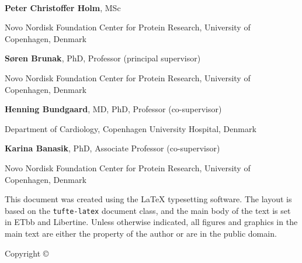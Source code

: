 \begin{@empty}
~\vfill
\thispagestyle{empty}
\setlength{\parindent}{0pt}
\setlength{\parskip}{\baselineskip}


\textbf{Peter Christoffer Holm}, MSc

Novo Nordisk Foundation Center for Protein Research,
University of Copenhagen, Denmark


\textbf{Søren Brunak}, PhD, Professor 
(principal supervisor)

Novo Nordisk Foundation Center for Protein Research, 
University of Copenhagen, Denmark

\textbf{Henning Bundgaard}, MD, PhD, Professor 
(co-supervisor)

Department of Cardiology,
Copenhagen University Hospital, Denmark

\textbf{Karina Banasik}, PhD, Associate Professor 
(co-supervisor)

Novo Nordisk Foundation Center for Protein Research, 
University of Copenhagen, Denmark

\vspace{2em}

\par{}

\vspace{5em}

\par This document was created using the \LaTeX{} typesetting software.
The layout is based on the \texttt{tufte-latex} document class,
and the main body of the text is set in \textsf{ETbb} and \textsf{Libertine}.
Unless otherwise indicated, all figures and graphics in the main text
are either the property of the author or are in the public domain.


Copyright \copyright\ \the\year\ \thanklessauthor
\end{@empty}
